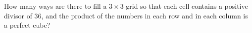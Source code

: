 How many ways are there to fill a $3\times3$ grid so that each cell contains a positive divisor of $36$, and the product of the numbers in each row and in each column is a perfect cube?
